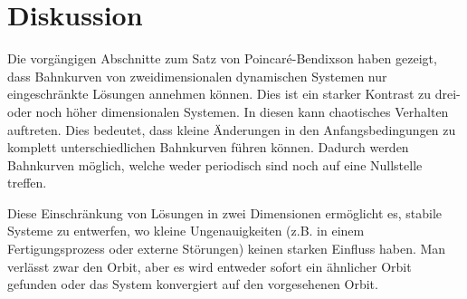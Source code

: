 \section{Diskussion} \label{poinbendix:section:diskussion}
Die vorgängigen Abschnitte zum Satz von Poincaré-Bendixson haben gezeigt, dass Bahnkurven von zweidimensionalen dynamischen Systemen nur eingeschränkte Lösungen annehmen können.
Dies ist ein starker Kontrast zu drei- oder noch höher dimensionalen Systemen.
In diesen kann chaotisches Verhalten auftreten.
Dies bedeutet, dass kleine Änderungen in den Anfangsbedingungen zu komplett unterschiedlichen Bahnkurven führen können.
Dadurch werden Bahnkurven möglich, welche weder periodisch sind noch auf eine Nullstelle treffen.

Diese Einschränkung von Lösungen in zwei Dimensionen ermöglicht es, stabile Systeme zu entwerfen, wo kleine Ungenauigkeiten (z.B. in einem Fertigungsprozess oder externe Störungen) keinen starken Einfluss haben.
Man verlässt zwar den Orbit, aber es wird entweder sofort ein ähnlicher Orbit gefunden oder das System konvergiert auf den vorgesehenen Orbit.
